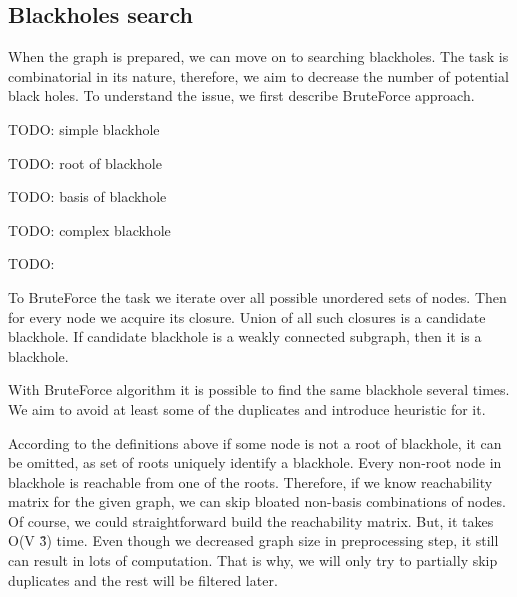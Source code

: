 \documentclass{svproc}
\begin{document}
%

%
\subsection{Blackholes search}
When the graph is prepared, we can move on to searching blackholes. The task is combinatorial in its nature, therefore, we aim to
decrease the number of potential black holes.
To understand the issue, we first describe BruteForce approach. \par

\begin{definition}
TODO: simple blackhole
\end{definition}

\begin{definition}
TODO: root of blackhole
\end{definition}

\begin{definition}
TODO: basis of blackhole
\end{definition}

\begin{definition}
TODO: complex blackhole
\end{definition}

\begin{definition}
TODO:
\end{definition}

To BruteForce the task we iterate over all possible unordered sets of nodes. 
Then for every node we acquire its closure. Union of all such closures is a candidate blackhole.
If candidate blackhole is a weakly connected subgraph, then it is a blackhole.

With BruteForce algorithm it is possible to find the same blackhole several times.
We aim to avoid at least some of the duplicates and introduce heuristic for it.

According to the definitions above if some node is not a root of blackhole, it can be omitted, as set of roots
uniquely identify a blackhole.
Every non-root node in blackhole is reachable from one of the roots. Therefore, if we know reachability matrix for
the given graph, we can skip bloated non-basis combinations of nodes.
Of course, we could straightforward build the reachability matrix. But, it takes O(V \^ 3) time. Even though we decreased graph size
in preprocessing step, it still can result in lots of computation. That is why, we will only try to partially skip duplicates and the rest will
be filtered later.\par
\end{document}
